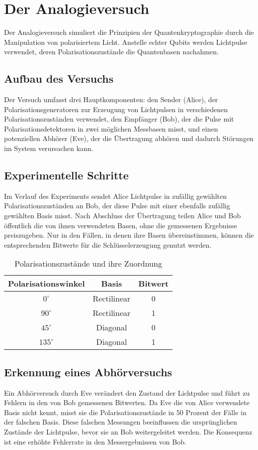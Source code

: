 \section{Der Analogieversuch}
Der Analogieversuch simuliert die Prinzipien der Quantenkryptographie durch die Manipulation von polarisiertem Licht. Anstelle echter Qubits werden Lichtpulse verwendet, deren Polarisationszustände die Quantenbasen nachahmen.

\subsection{Aufbau des Versuchs}
Der Versuch umfasst drei Hauptkomponenten: den Sender (Alice), der Polarisationsgeneratoren zur Erzeugung von Lichtpulsen in verschiedenen Polarisationszuständen verwendet, den Empfänger (Bob), der die Pulse mit Polarisationsdetektoren in zwei möglichen Messbasen misst, und einen potenziellen Abhörer (Eve), der die Übertragung abhören und dadurch Störungen im System verursachen kann.

\subsection{Experimentelle Schritte}
Im Verlauf des Experiments sendet Alice Lichtpulse in zufällig gewählten Polarisationszuständen an Bob, der diese Pulse mit einer ebenfalls zufällig gewählten Basis misst. Nach Abschluss der Übertragung teilen Alice und Bob öffentlich die von ihnen verwendeten Basen, ohne die gemessenen Ergebnisse preiszugeben. Nur in den Fällen, in denen ihre Basen übereinstimmen, können die entsprechenden Bitwerte für die Schlüsselerzeugung genutzt werden. 

\begin{table}[H]
\centering
\caption{Polarisationszustände und ihre Zuordnung}
\begin{tabular}{ccc}
\toprule
\textbf{Polarisationswinkel} & \textbf{Basis} & \textbf{Bitwert} \\
\midrule
\(0^\circ\) & Rectilinear & 0 \\
\(90^\circ\) & Rectilinear & 1 \\
\(45^\circ\) & Diagonal & 0 \\
\(135^\circ\) & Diagonal & 1 \\
\bottomrule
\end{tabular}
\end{table}

\subsection{Erkennung eines Abhörversuchs}
Ein Abhörversuch durch Eve verändert den Zustand der Lichtpulse und führt zu Fehlern in den von Bob gemessenen Bitwerten. Da Eve die von Alice verwendete Basis nicht kennt, misst sie die Polarisationszustände in 50 Prozent der Fälle in der falschen Basis. Diese falschen Messungen beeinflussen die ursprünglichen Zustände der Lichtpulse, bevor sie an Bob weitergeleitet werden. Die Konsequenz ist eine erhöhte Fehlerrate in den Messergebnissen von Bob.


